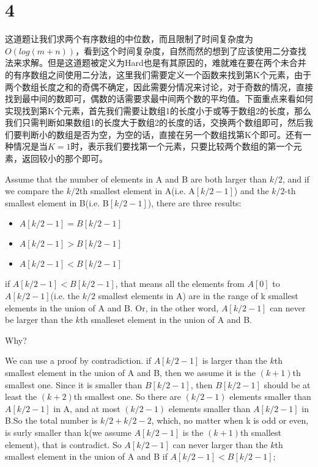 \documentclass[12pt,a4paper]{article}
\begin{document}
\section{4}
\begin{CJK}{UTF8}{gbsn}
这道题让我们求两个有序数组的中位数，而且限制了时间复杂度为$O(log (m+n))$，看到这个时间复杂度，自然而然的想到了应该使用二分查找法来求解。但是这道题被定义为Hard也是有其原因的，难就难在要在两个未合并的有序数组之间使用二分法，这里我们需要定义一个函数来找到第K个元素，由于两个数组长度之和的奇偶不确定，因此需要分情况来讨论，对于奇数的情况，直接找到最中间的数即可，偶数的话需要求最中间两个数的平均值。下面重点来看如何实现找到第K个元素，首先我们需要让数组1的长度小于或等于数组2的长度，那么我们只需判断如果数组1的长度大于数组2的长度的话，交换两个数组即可，然后我们要判断小的数组是否为空，为空的话，直接在另一个数组找第K个即可。还有一种情况是当$K = 1$时，表示我们要找第一个元素，只要比较两个数组的第一个元素，返回较小的那个即可。
\end{CJK}
\par
Assume that the number of elements in A and B are both larger than $k/2$, and if we compare the $k/2$th smallest element in A(i.e. A$[k/2-1]$) and the $k/2$-th smallest element in B(i.e. B$[k/2 - 1]$), there are three results:
\begin{itemize}
\item $A[k/2-1] = B[k/2-1]$
\item $A[k/2-1] > B[k/2-1]$
\item $A[k/2-1] < B[k/2-1]$
\end{itemize}
if $A[k/2-1] < B[k/2-1]$, that means all the elements from $A[0]$ to $A[k/2-1]$(i.e. the $k/2$ smallest elements in A) are in the range of k smallest elements in the union of A and B. Or, in the other word, $A[k/2 - 1]$ can never be larger than the $k$th smalleset element in the union of A and B.
\par
Why?
\par
We can use a proof by contradiction. if $A[k/2 - 1]$ is larger than the $k$th smallest element in the union of A and B, then we assume it is the $(k+1)$th smallest one. Since it is smaller than $B[k/2 - 1]$, then $B[k/2 - 1]$ should be at least the $(k+2)$th smallest one. So there are $(k/2-1)$ elements smaller than $A[k/2-1]$ in A, and at most $(k/2 - 1)$ elements smaller than $A[k/2-1]$ in B.So the total number is $k/2+k/2-2$, which, no matter when k is odd or even, is surly smaller than k(we assume $A[k/2-1]$ is the $(k+1)$th smallest element), that is contradict. So $A[k/2-1]$ can never larger than the $k$th smallest element in the union of A and B if $A[k/2-1]<B[k/2-1]$;
\end{document}
